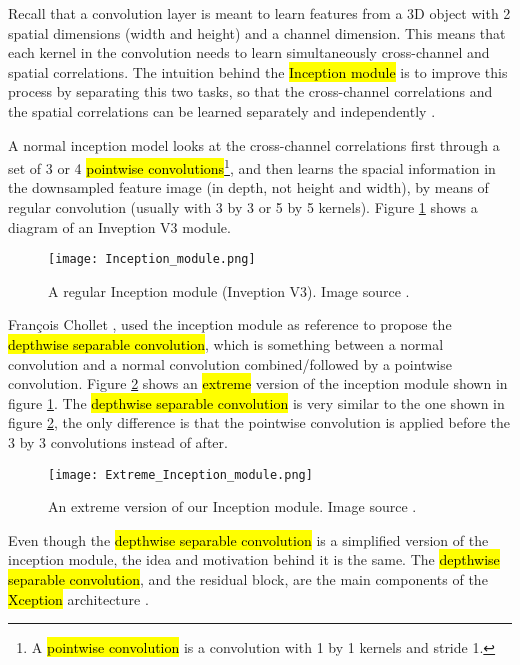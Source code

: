 Recall that a convolution layer is meant to learn features from a 3D object with 2 spatial dimensions (width and height) and a channel dimension. This means that each kernel in the convolution needs to learn simultaneously cross-channel and spatial correlations.
The intuition behind the \hl{Inception module} is to improve this process by separating this two tasks, so that the cross-channel correlations and the spatial correlations can be learned separately and independently \cite{chollet2017xception}.

A normal inception model looks at the cross-channel correlations first through a set of 3 or 4 \hl{pointwise convolutions}\footnote{A \hl{pointwise convolution} is a convolution with 1 by 1 kernels and stride 1.}, and then learns the spacial information in the downsampled feature image (in depth, not height and width), by means of regular convolution (usually with 3 by 3 or 5 by 5 kernels). Figure \ref{fig:basics:inception_module} shows a diagram of an Inveption V3 module.

\begin{figure}[!ht]
  \centering
  \texttt{[image: Inception\_module.png]}
  \caption{A regular Inception module (Inveption V3). Image source \cite{chollet2017xception}.}
  \label{fig:basics:inception_module}
\end{figure}

François Chollet \cite{chollet2017xception}, used the inception module as reference to propose the \hl{depthwise separable convolution}, which is something between a normal convolution and a normal convolution combined/followed by a pointwise convolution.
Figure \ref{fig:basics:extreme_inception_module} shows an \hl{extreme} version of the inception module shown in figure \ref{fig:basics:inception_module}. The \hl{depthwise separable convolution} is very similar to the one shown in figure \ref{fig:basics:extreme_inception_module}, the only difference is that the pointwise convolution is applied before the 3 by 3 convolutions instead of after.

\begin{figure}[!ht]
  \centering
  \texttt{[image: Extreme\_Inception\_module.png]}
  \caption{An extreme version of our Inception module. Image source \cite{chollet2017xception}.}
  \label{fig:basics:extreme_inception_module}
\end{figure}

Even though the \hl{depthwise separable convolution} is a simplified version of the inception module, the idea and motivation behind it is the same. The \hl{depthwise separable convolution}, and the residual block, are the main components of the \hl{Xception} architecture \cite{chollet2017xception}.
